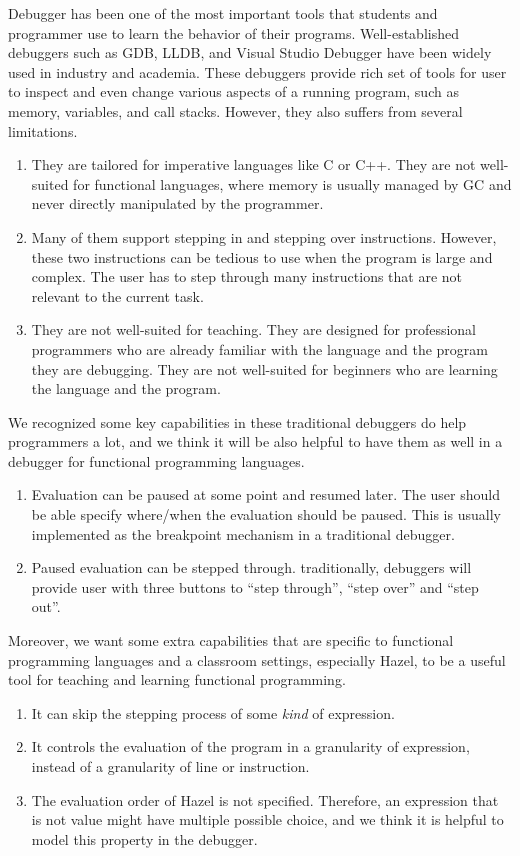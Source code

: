 Debugger has been one of the most important tools that students and programmer
use to learn the behavior of their programs. Well-established debuggers such as
GDB, LLDB, and Visual Studio Debugger have been widely used in industry and
academia. These debuggers provide rich set of tools for user to inspect and even
change various aspects of a running program, such as memory, variables,
and call stacks. However, they also suffers from several limitations.

\begin{enumerate}
  \item They are tailored for imperative languages like C or C++. They are not
    well-suited for functional languages, where memory is usually managed by
    GC and never directly manipulated by the programmer.
  \item Many of them support stepping in and stepping over instructions. However,
    these two instructions can be tedious to use when the program is large and
    complex. The user has to step through many instructions that are not relevant
    to the current task.
  \item They are not well-suited for teaching. They are designed for professional
    programmers who are already familiar with the language and the program they
    are debugging. They are not well-suited for beginners who are learning the
    language and the program.
\end{enumerate}

We recognized some key capabilities in these traditional debuggers do
help programmers a lot, and we think it will be also helpful to have
them as well in a debugger for functional programming languages.
\begin{enumerate}
  \item Evaluation can be paused at some point and resumed later. The user
    should be able specify where/when the evaluation should be paused. This is
    usually implemented as the breakpoint mechanism in a traditional debugger.
  \item Paused evaluation can be stepped through. traditionally, debuggers will
    provide user with three buttons to ``step through'', ``step over'' and
    ``step out''.
\end{enumerate}

Moreover, we want some extra capabilities that are specific to functional
programming languages and a classroom settings, especially Hazel, to be a
useful tool for teaching and learning functional programming.
\begin{enumerate}
  \item It can skip the stepping process of some \emph{kind} of expression.
  \item It controls the evaluation of the program in a granularity of
    expression, instead of a granularity of line or instruction.
  \item The evaluation order of Hazel is not specified. Therefore, an
    expression that is not value might have multiple possible choice,
    and we think it is helpful to model this property in the debugger.
\end{enumerate}


